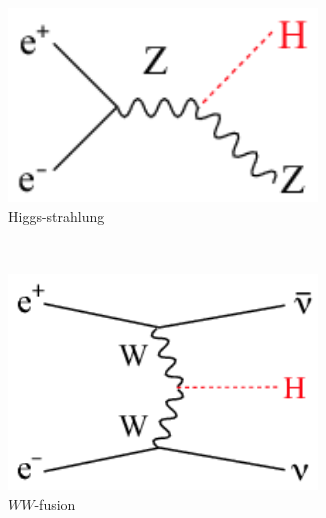     \begin{figure}[!tbh]  
        \centering
        \begin{subfigure}[t]{0.3\textwidth}
            \includegraphics[width = 0.9\textwidth]{Pictures/Higgs/Chapter_Theory_figs_ZHdiagram.png}
            \caption{Higgs-strahlung}
            \label{fig:higgsStrahlung}
        \end{subfigure}
        ~%
        \begin{subfigure}[t]{0.3\textwidth}
            \includegraphics[width = 0.9\textwidth]{Pictures/Higgs/Chapter_Theory_figs_nunuHdiagram.png}
            \caption{$WW$-fusion}
            \label{fig:WW-fusion}
        \end{subfigure}
        ~%
        \begin{subfigure}[t]{0.3\textwidth}

\end{subfigure}
\end{figure}

